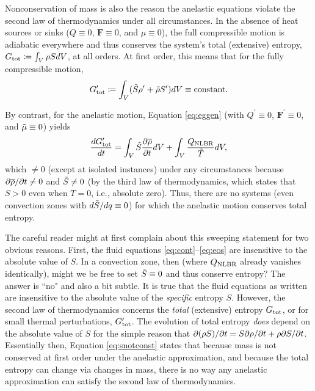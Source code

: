 \documentclass[12pt]{article}
\newcommand{\vecf}{\bm{F}}
\newcommand{\heatnlbr}{Q_{\rm NLBR}}
\newcommand{\gtot}{G_{\rm tot}  }
\newcommand{\gptot}{G^\prime_{\rm tot}  }
\begin{document}
Nonconservation of mass is also the reason the anelastic equations violate the second law of thermodynamics under all circumstances. In the absence of heat sources or sinks ($Q\equiv0$, $\vecf\equiv0$, and $\mu\equiv0$), the full compressible motion is adiabatic everywhere and thus conserves the system's total (extensive) entropy, $\gtot\define\int_V\rho SdV$, at all orders. At first order, this means that for the fully compressible motion,
\begin{align}\label{eq:sconst}
	\gptot\define \int_V(\entrtilde\rhoprime + \rhotilde\entrprime)dV \equiv \text{constant}.
\end{align}

By contrast, for the anelastic motion, Equation \eqref{eq:eggen} (with $Q^\prime\equiv0$, $\vecf^\prime\equiv0$, and $\tilde{\mu}\equiv0$) yields
 \begin{align}\label{eq:snotconst}
 	\frac{d\gptot}{dt}= \int_V\entrtilde \pderiv{\rhoover}{t}dV + \int_V \frac{\heatnlbr}{\tmptilde}dV, 
 \end{align}
 which $\neq0$ (except at isolated instances) under any circumstances because $\partial\overline{\rho}/\partial t\neq0$ and $\tilde{S}\neq0$ (by the third law of thermodynamics, which states that $S>0$ even when $T=0$, i.e., absolute zero). Thus, there are no systems (even convection zones with $d\tilde{S}/dq\equiv0$) for which the anelastic motion conserves total entropy. 
 
The careful reader might at first complain about this sweeping statement for two obvious reasons. First, the fluid equations \eqref{eq:cont}--\eqref{eq:eos} are insensitive to the absolute value of $S$. In a convection zone, then (where $\heatnlbr$ already vanishes identically), might we be free to set $\tilde{S}\equiv0$ and thus conserve entropy? The answer is ``no" and also a bit subtle. It is true that the fluid equations as written are insensitive to the absolute value of the \textit{specific} entropy $S$. However, the second law of thermodynamics concerns the \textit{total} (extensive) entropy $\gtot$, or for small thermal perturbations, $\gptot$. The evolution of total entropy \textit{does} depend on the absolute value of $S$ for the simple reason that $\partial(\rho S)/\partial t = S\partial\rho/\partial t + \rho\partial S/\partial t$. Essentially then, Equation \eqref{eq:snotconst} states that because mass is not conserved at first order under the anelastic approximation, and because the total entropy can change via changes in mass, there is no way any anelastic approximation can satisfy the second law of thermodynamics. 
\end{document}
